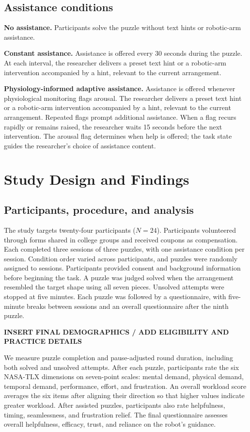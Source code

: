\documentclass[sigconf,anonymous]{aamas}
\begin{document}
\subsection{Assistance conditions}

\textbf{No assistance.} Participants solve the puzzle without text hints or robotic-arm assistance.

\textbf{Constant assistance.} Assistance is offered every 30 seconds during the puzzle. At each interval, the researcher delivers a preset text hint or a robotic-arm intervention accompanied by a hint, relevant to the current arrangement.

\textbf{Physiology-informed adaptive assistance.} Assistance is offered whenever physiological monitoring flags arousal. The researcher delivers a preset text hint or a robotic-arm intervention accompanied by a hint, relevant to the current arrangement. Repeated flags prompt additional assistance. When a flag recurs rapidly or remains raised, the researcher waits 15 seconds before the next intervention. The arousal flag determines when help is offered; the task state guides the researcher’s choice of assistance content.

\section{Study Design and Findings}

\subsection{Participants, procedure, and analysis}

The study targets twenty-four participants ($N=24$). Participants volunteered through forms shared in college groups and received coupons as compensation. Each completed three sessions of three puzzles, with one assistance condition per session. Condition order varied across participants, and puzzles were randomly assigned to sessions. Participants provided consent and background information before beginning the task. A puzzle was judged solved when the arrangement resembled the target shape using all seven pieces. Unsolved attempts were stopped at five minutes. Each puzzle was followed by a questionnaire, with five-minute breaks between sessions and an overall questionnaire after the ninth puzzle.

\textbf{INSERT FINAL DEMOGRAPHICS / ADD ELIGIBILITY AND PRACTICE DETAILS}

We measure puzzle completion and pause-adjusted round duration, including both solved and unsolved attempts. After each puzzle, participants rate the six NASA-TLX dimensions on seven-point scales: mental demand, physical demand, temporal demand, performance, effort, and frustration. An overall workload score averages the six items after aligning their direction so that higher values indicate greater workload. After assisted puzzles, participants also rate helpfulness, timing, seamlessness, and frustration relief. The final questionnaire assesses overall helpfulness, efficacy, trust, and reliance on the robot's guidance.
\end{document}

